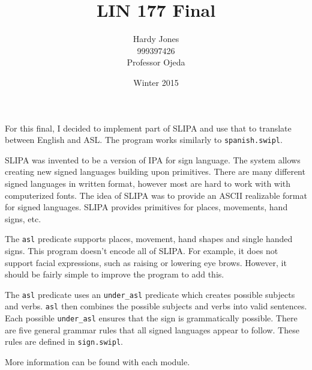 \documentclass[12pt,letterpaper]{article}
\title{LIN 177 Final\vspace{-2ex}}
\author{Hardy Jones\\
        999397426\\
        Professor Ojeda\vspace{-2ex}}
\date{Winter 2015}
\begin{document}
  \maketitle


  For this final, I decided to implement part of SLIPA and use that to translate between English and ASL. \autocite{slipa}
  The program works similarly to \texttt{spanish.swipl}.

  SLIPA was invented to be a version of IPA for sign language.
  The system allows creating new signed languages building upon primitives.
  There are many different signed languages in written format, however most are hard to work with with computerized fonts.
  The idea of SLIPA was to provide an ASCII realizable format for signed languages.
  SLIPA provides primitives for places, movements, hand signs, etc.

  The \texttt{asl} predicate supports places, movement, hand shapes and single handed signs.
  This program doesn't encode all of SLIPA. For example, it does not support facial expressions, such as raising or lowering eye brows.
  However, it should be fairly simple to improve the program to add this.

  The \texttt{asl} predicate uses an \texttt{under\_asl} predicate which creates possible subjects and verbs.
  \texttt{asl} then combines the possible subjects and verbs into valid sentences.
  Each possible \texttt{under\_asl} ensures that the sign is grammatically possible.
  There are five general grammar rules that all signed languages appear to follow.
  These rules are defined in \texttt{sign.swipl}.

  More information can be found with each module.

  

  \printbibliography
\end{document}
